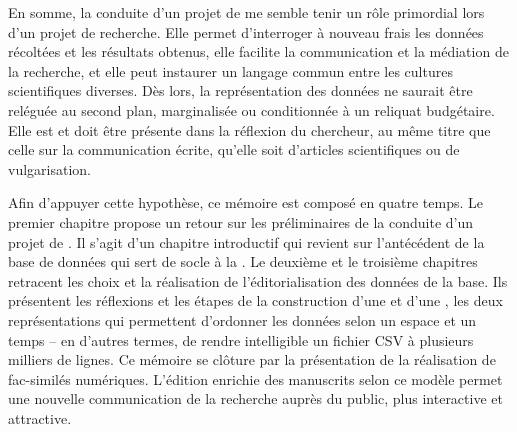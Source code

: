 En somme, la conduite d’un projet de  me semble tenir un rôle primordial lors d’un projet de recherche. Elle permet d’interroger à nouveau frais les données récoltées et les résultats obtenus, elle facilite la communication et la médiation de la recherche, et elle peut instaurer un langage commun entre les cultures scientifiques diverses. Dès lors, la représentation des données ne saurait être reléguée au second plan, marginalisée ou conditionnée à un reliquat budgétaire. Elle est et doit être présente dans la réflexion du chercheur, au même titre que celle sur la communication écrite, qu’elle soit d’articles scientifiques ou de vulgarisation. \newline\par
Afin d’appuyer cette hypothèse, ce mémoire est composé en quatre temps. Le premier chapitre propose un retour sur les préliminaires de la conduite d’un projet de . Il s’agit d’un chapitre introductif qui revient sur l’antécédent de la base de données qui sert de socle à la . Le deuxième et le troisième chapitres retracent les choix et la réalisation de l’éditorialisation des données de la base. Ils présentent les réflexions et les étapes de la construction d’une  et d’une , les deux représentations qui permettent d’ordonner les données selon un espace et un temps – en d’autres termes, de rendre intelligible un fichier CSV à plusieurs milliers de lignes. Ce mémoire se clôture par la présentation de la réalisation de fac-similés numériques. L’édition enrichie des manuscrits selon ce modèle permet une nouvelle communication de la recherche auprès du public, plus interactive et attractive.